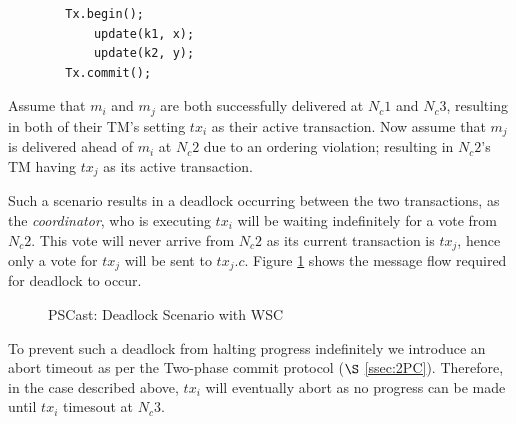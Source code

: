     \noindent
    \begin{minipage}{\textwidth}
        \begin{lstlisting}
	    Tx.begin();
		    update(k1, x);
		    update(k2, y);
		Tx.commit();
        \end{lstlisting}
    \end{minipage}
    
    
    Assume that $m_i$ and $m_j$ are both successfully delivered at $N_c1$ and $N_c3$, resulting in both of their TM's setting $tx_i$ as their active transaction.  Now assume that $m_j$ is delivered ahead of $m_i$ at $N_c2$ due to an ordering violation;  resulting in $N_c2$'s TM having $tx_j$ as its active transaction.  
    
    Such a scenario results in a deadlock occurring between the two transactions, as the \emph{coordinator}, who is executing $tx_i$ will be waiting indefinitely for a vote from $N_c2$.  This vote will never arrive from $N_c2$ as its current transaction is $tx_j$, hence only a vote for $tx_j$ will be sent to $tx_j.c$.  Figure \ref{fig:wsc_deadlock} shows the message flow required for deadlock to occur.  
    
    \begin{figure}[h] 
        \centering
         \caption[\textsf{PSCast}: Deadlock Scenario with WSC]{\textsf{PSCast}: Deadlock Scenario with WSC}
         \label{fig:wsc_deadlock}
    \end{figure}       
    
    To prevent such a deadlock from halting progress indefinitely we introduce an abort timeout as per the Two-phase commit protocol ($\S$ \ref{ssec:2PC}).  Therefore, in the case described above, $tx_i$ will eventually abort as no progress can be made until $tx_i$ timesout at $N_c3$.
    
